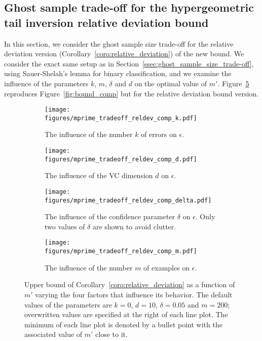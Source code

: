 \documentclass[twoside,11pt]{article}
\begin{document}
\subsection{Ghost sample trade-off for the hypergeometric tail inversion relative deviation bound}
\label{app:ghost_sample_tradeoff_hti-rd}

In this section, we consider the ghost sample size trade-off for the relative deviation version (Corollary~\ref{coro:relative_deviation}) of the new bound.
We consider the exact same setup as in Section~\ref{ssec:ghost_sample_size_trade-off}, using Sauer-Shelah's lemma for binary classification, and we examine the influence of the parameters $k$, $m$, $\delta$ and $d$ on the optimal value of $m'$.
Figure~\ref{fig:bound_comp_reldev} reproduces Figure~\ref{fig:bound_comp} but for the relative deviation bound version.


\begin{figure}[h]
\centering
\begin{subfigure}[t]{0.485\textwidth}
    \centering
    \texttt{[image: figures/mprime\_tradeoff\_reldev\_comp\_k.pdf]}
    \caption{The influence of the number $k$ of errors on $\epsilon$.}
    \label{fig:comp_reldev_k}
\end{subfigure}\hfill
\begin{subfigure}[t]{0.485\textwidth}
    \centering
    \texttt{[image: figures/mprime\_tradeoff\_reldev\_comp\_d.pdf]}
    \caption{The influence of the VC dimension $d$ on $\epsilon$.}
    \label{fig:comp_reldev_d}
\end{subfigure}

\vspace{10pt}

\begin{subfigure}[t]{0.485\textwidth}
    \centering
    \texttt{[image: figures/mprime\_tradeoff\_reldev\_comp\_delta.pdf]}
    \caption{The influence of the confidence parameter $\delta$ on $\epsilon$. Only two values of $\delta$ are shown to avoid clutter.}
    \label{fig:comp_reldev_delta}
\end{subfigure}\hfill
\begin{subfigure}[t]{0.485\textwidth}
    \centering
    \texttt{[image: figures/mprime\_tradeoff\_reldev\_comp\_m.pdf]}
    \caption{The influence of the number $m$ of examples on $\epsilon$.}
    \label{fig:comp_reldev_m}
\end{subfigure}
\caption{Upper bound of Corollary~\ref{coro:relative_deviation} as a function of $m'$ varying the four factors that influence its behavior.
The default values of the parameters are $k=0$, $d=10$, $\delta=0.05$ and $m=200$; overwritten values are specified at the right of each line plot.
The minimum of each line plot is denoted by a bullet point with the associated value of $m'$ close to it.}
\label{fig:bound_comp_reldev}
\end{figure}
\end{document}
